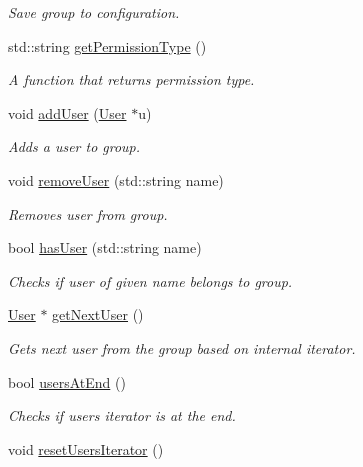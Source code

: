 \begin{DoxyCompactItemize}
\begin{DoxyCompactList}\small\item\em Save group to configuration. \end{DoxyCompactList}\item 
std\+::string \hyperlink{class_r_c_f_1_1_server_1_1_group_ab163fc5265542a643719e4b5ba938fc9}{get\+Permission\+Type} ()
\begin{DoxyCompactList}\small\item\em A function that returns permission type. \end{DoxyCompactList}\item 
void \hyperlink{class_r_c_f_1_1_server_1_1_group_a1d2797048cc2848018959e5ea3987f38}{add\+User} (\hyperlink{class_r_c_f_1_1_server_1_1_user}{User} $\ast$u)
\begin{DoxyCompactList}\small\item\em Adds a user to group. \end{DoxyCompactList}\item 
void \hyperlink{class_r_c_f_1_1_server_1_1_group_aed955c18531ec902f7aaa707adffb843}{remove\+User} (std\+::string name)
\begin{DoxyCompactList}\small\item\em Removes user from group. \end{DoxyCompactList}\item 
bool \hyperlink{class_r_c_f_1_1_server_1_1_group_ac03146268c35aaee7e6082ff12d4ea51}{has\+User} (std\+::string name)
\begin{DoxyCompactList}\small\item\em Checks if user of given name belongs to group. \end{DoxyCompactList}\item 
\hyperlink{class_r_c_f_1_1_server_1_1_user}{User} $\ast$ \hyperlink{class_r_c_f_1_1_server_1_1_group_aaa52fa08e644d75147adfef311ad062a}{get\+Next\+User} ()
\begin{DoxyCompactList}\small\item\em Gets next user from the group based on internal iterator. \end{DoxyCompactList}\item 
bool \hyperlink{class_r_c_f_1_1_server_1_1_group_ad23bac50d5d3fd209ae9dc667caef2ce}{users\+At\+End} ()
\begin{DoxyCompactList}\small\item\em Checks if users iterator is at the end. \end{DoxyCompactList}\item 
\hypertarget{class_r_c_f_1_1_server_1_1_group_a7432af6488f5af0aeea60d000816e93e}{}void \hyperlink{class_r_c_f_1_1_server_1_1_group_a7432af6488f5af0aeea60d000816e93e}{reset\+Users\+Iterator} ()\label{class_r_c_f_1_1_server_1_1_group_a7432af6488f5af0aeea60d000816e93e}


\end{DoxyCompactItemize}
